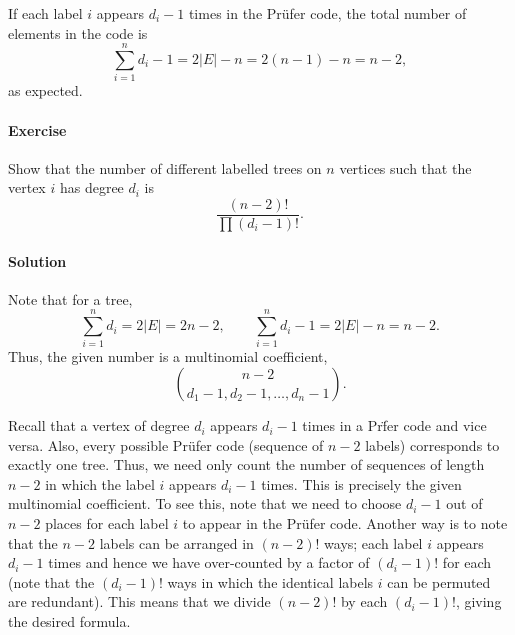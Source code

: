 \documentclass[10pt]{article}
\newcounter{prob}
\newcommand{\problem}{\stepcounter{prob}\paragraph{Exercise \arabic{prob}}}
\newcommand{\solution}{\paragraph{Solution}}
\begin{document}
    If each label $i$ appears $d_i - 1$ times in the Pr\"ufer code, the total number
    of elements in the code is \[
        \sum_{i = 1}^n d_i - 1 = 2|E| - n = 2(n - 1) - n = n - 2,
    \] as expected.


    \problem Show that the number of different labelled trees on $n$ vertices such
    that the vertex $i$ has degree $d_i$ is \[
        \frac{(n - 2)!}{\prod (d_i - 1)!}.
    \] 

    \solution Note that for a tree, \[
        \sum_{i = 1}^n d_i = 2|E| = 2n - 2, \qquad
        \sum_{i = 1}^n d_i  - 1 = 2|E| - n = n - 2.
    \] Thus, the given number is a multinomial coefficient, \[
        \binom{n - 2}{d_1 - 1, d_2 - 1, \dots, d_n - 1}.
    \] 

    Recall that a vertex of degree $d_i$ appears $d_i - 1$ times in a Pr\"fer code
    and vice versa. Also, every possible Pr\"ufer code (sequence of $n - 2$ labels)
    corresponds to exactly one tree. Thus, we need only count the number of sequences
    of length $n - 2$ in which the label $i$ appears $d_i - 1$ times. This is
    precisely the given multinomial coefficient. To see this, note that we need to
    choose $d_i - 1$ out of $n - 2$ places for each label $i$ to appear in the
    Pr\"ufer code. Another way is to note that the $n - 2$ labels can be arranged in
    $(n - 2)!$ ways; each label $i$ appears $d_i - 1$ times and hence we have
    over-counted by a factor of $(d_i - 1)!$ for each (note that the $(d_i - 1)!$
    ways in which the identical labels $i$ can be permuted are redundant). This means
    that we divide $(n - 2)!$ by each $(d_i - 1)!$, giving the desired formula.

    
\end{document}
